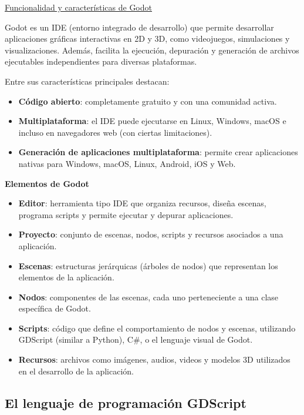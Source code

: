 \documentclass[12pt]{report} %
\providecommand{\tightlist}{%
  \setlength{\itemsep}{0pt}\setlength{\parskip}{0pt}}
\begin{document}
\underline{Funcionalidad y características de Godot}

Godot es un IDE (entorno integrado de desarrollo) que permite
desarrollar aplicaciones gráficas interactivas en 2D y 3D, como
videojuegos, simulaciones y visualizaciones. Además, facilita la
ejecución, depuración y generación de archivos ejecutables
independientes para diversas plataformas.

Entre sus características principales destacan:

\begin{itemize}
\tightlist
\item
  \textbf{Código abierto}: completamente gratuito y con una comunidad
  activa.
\item
  \textbf{Multiplataforma}: el IDE puede ejecutarse en Linux, Windows,
  macOS e incluso en navegadores web (con ciertas limitaciones).
\item
  \textbf{Generación de aplicaciones multiplataforma}: permite crear
  aplicaciones nativas para Windows, macOS, Linux, Android, iOS y Web.
\end{itemize}

\textbf{Elementos de Godot}

\begin{itemize}
\tightlist
\item
  \textbf{Editor}: herramienta tipo IDE que organiza recursos, diseña
  escenas, programa scripts y permite ejecutar y depurar aplicaciones.
\item
  \textbf{Proyecto}: conjunto de escenas, nodos, scripts y recursos
  asociados a una aplicación.
\item
  \textbf{Escenas}: estructuras jerárquicas (árboles de nodos) que
  representan los elementos de la aplicación.
\item
  \textbf{Nodos}: componentes de las escenas, cada uno perteneciente a
  una clase específica de Godot.
\item
  \textbf{Scripts}: código que define el comportamiento de nodos y
  escenas, utilizando GDScript (similar a Python), C\#, o el lenguaje
  visual de Godot.
\item
  \textbf{Recursos}: archivos como imágenes, audios, videos y modelos 3D
  utilizados en el desarrollo de la aplicación.
\end{itemize}

\hypertarget{el-lenguaje-de-programaciuxf3n-gdscript}{%
\subsection{El lenguaje de programación
GDScript}\label{el-lenguaje-de-programaciuxf3n-gdscript}}
\end{document}
